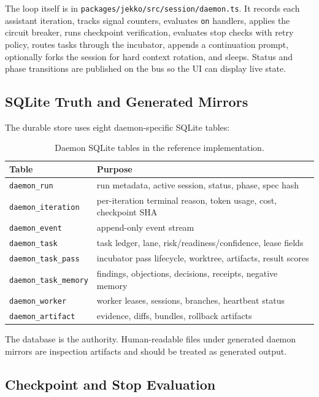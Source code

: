 \documentclass[conference]{IEEEtran}
\begin{document}
The loop itself is in \texttt{packages/jekko/src/session/daemon.ts}. It records each assistant iteration, tracks signal counters, evaluates \texttt{on} handlers, applies the circuit breaker, runs checkpoint verification, evaluates stop checks with retry policy, routes tasks through the incubator, appends a continuation prompt, optionally forks the session for hard context rotation, and sleeps. Status and phase transitions are published on the bus so the UI can display live state.

\subsection{SQLite Truth and Generated Mirrors}

The durable store uses eight daemon-specific SQLite tables:

\begin{table}[t]
\centering
\caption{Daemon SQLite tables in the reference implementation.}
\label{tab:tables}
\footnotesize
\begin{tabularx}{\columnwidth}{p{29mm}X}
\toprule
Table & Purpose \\
\midrule
\texttt{daemon\_run} & run metadata, active session, status, phase, spec hash \\
\texttt{daemon\_iteration} & per-iteration terminal reason, token usage, cost, checkpoint SHA \\
\texttt{daemon\_event} & append-only event stream \\
\texttt{daemon\_task} & task ledger, lane, risk/readiness/confidence, lease fields \\
\texttt{daemon\_task\_pass} & incubator pass lifecycle, worktree, artifacts, result scores \\
\texttt{daemon\_task\_memory} & findings, objections, decisions, receipts, negative memory \\
\texttt{daemon\_worker} & worker leases, sessions, branches, heartbeat status \\
\texttt{daemon\_artifact} & evidence, diffs, bundles, rollback artifacts \\
\bottomrule
\end{tabularx}
\end{table}

The database is the authority. Human-readable files under generated daemon mirrors are inspection artifacts and should be treated as generated output.

\subsection{Checkpoint and Stop Evaluation}
\end{document}
